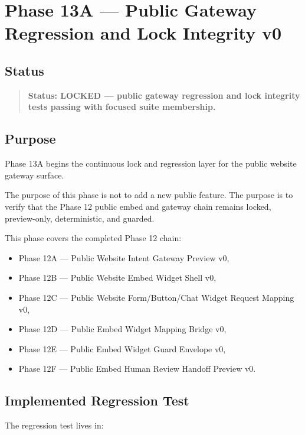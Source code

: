 \section{Phase 13A --- Public Gateway Regression and Lock Integrity v0}
\label{sec:aion-phase13-public-gateway-regression-lock-v0}

\subsection{Status}

\begin{quote}
\textbf{Status: LOCKED --- public gateway regression and lock integrity tests passing with focused suite membership.}
\end{quote}

\subsection{Purpose}

Phase 13A begins the continuous lock and regression layer for the public website gateway surface.

The purpose of this phase is not to add a new public feature. The purpose is to verify that the Phase 12 public embed and gateway chain remains locked, preview-only, deterministic, and guarded.

This phase covers the completed Phase 12 chain:

\begin{itemize}
  \item Phase 12A --- Public Website Intent Gateway Preview v0,
  \item Phase 12B --- Public Website Embed Widget Shell v0,
  \item Phase 12C --- Public Website Form/Button/Chat Widget Request Mapping v0,
  \item Phase 12D --- Public Embed Widget Mapping Bridge v0,
  \item Phase 12E --- Public Embed Widget Guard Envelope v0,
  \item Phase 12F --- Public Embed Human Review Handoff Preview v0.
\end{itemize}

\subsection{Implemented Regression Test}

The regression test lives in:


